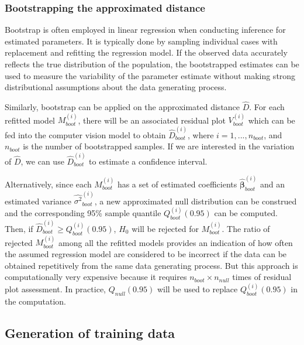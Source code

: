 \documentclass[]{interact}
\theoremstyle{plain}%
\theoremstyle{definition}
\theoremstyle{remark}
\begin{document}
\hypertarget{bootstrapping-the-approximated-distance}{%
\subsubsection{Bootstrapping the approximated
distance}\label{bootstrapping-the-approximated-distance}}

Bootstrap is often employed in linear regression when conducting
inference for estimated parameters. It is typically done by sampling
individual cases with replacement and refitting the regression model. If
the observed data accurately reflects the true distribution of the
population, the bootstrapped estimates can be used to measure the
variability of the parameter estimate without making strong
distributional assumptions about the data generating process.

Similarly, bootstrap can be applied on the approximated distance
\(\hat{D}\). For each refitted model \(M_{boot}^{(i)}\), there will be
an associated residual plot \(V_{boot}^{(i)}\) which can be fed into the
computer vision model to obtain \(\hat{D}_{boot}^{(i)}\), where
\(i = 1,...,n_{boot}\), and \(n_{boot}\) is the number of bootstrapped
samples. If we are interested in the variation of \(\hat{D}\), we can
use \(\hat{D}_{boot}^{(i)}\) to estimate a confidence interval.

Alternatively, since each \(M_{boot}^{(i)}\) has a set of estimated
coefficients \(\hat{\boldsymbol{\beta}}_{boot}^{(i)}\) and an estimated
variance \(\hat{\sigma^2}_{boot}^{(i)}\), a new approximated null
distribution can be construed and the corresponding 95\% sample quantile
\(Q_{boot}^{(i)}(0.95)\) can be computed. Then, if
\(\hat{D}_{boot}^{(i)} \geq Q_{boot}^{(i)}(0.95)\), \(H_0\) will be
rejected for \(M_{boot}^{(i)}\). The ratio of rejected
\(M_{boot}^{(i)}\) among all the refitted models provides an indication
of how often the assumed regression model are considered to be incorrect
if the data can be obtained repetitively from the same data generating
process. But this approach is computationally very expensive because it
requires \(n_{boot} \times n_{null}\) times of residual plot assessment.
In practice, \(Q_{null}(0.95)\) will be used to replace
\(Q_{boot}^{(i)}(0.95)\) in the computation.

\hypertarget{generation-of-training-data}{%
\subsection{Generation of training
data}\label{generation-of-training-data}}
\end{document}
